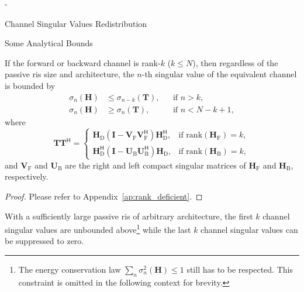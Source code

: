 \begin{section}{-}
\begin{subsection}{Channel Singular Values Redistribution}
\begin{subsubsection}{Some Analytical Bounds}
			\begin{proposition}\label{pp:rank_deficient}
				If the forward or backward channel is rank-$k$ ($k \le N$), then regardless of the passive \gls{ris} size and architecture, the $n$-th singular value of the equivalent channel is bounded by
				\begin{subequations}
					\begin{align}
						\sigma_n(\mathbf{H}) & \le \sigma_{n-k}(\mathbf{T}), &  & \text{if } n > k, \label{iq:sv_bound_enlarge}          \\
						\sigma_n(\mathbf{H}) & \ge \sigma_n(\mathbf{T}),     &  & \text{if } n < N - k + 1, \label{iq:sv_bound_suppress}
					\end{align}
					\label{iq:sv_bound_rank_deficient}
				\end{subequations}
				where
				\begin{equation}
					\mathbf{T} \mathbf{T}^\mathsf{H} =
					\begin{cases}
						\mathbf{H}_\mathrm{D} (\mathbf{I} - \mathbf{V}_\mathrm{F} \mathbf{V}_\mathrm{F}^\mathsf{H}) \mathbf{H}_\mathrm{D}^\mathsf{H}, & \text{if } \mathrm{rank}(\mathbf{H}_\mathrm{F}) = k, \\
						\mathbf{H}_\mathrm{D}^\mathsf{H} (\mathbf{I} - \mathbf{U}_\mathrm{B} \mathbf{U}_\mathrm{B}^\mathsf{H}) \mathbf{H}_\mathrm{D}, & \text{if } \mathrm{rank}(\mathbf{H}_\mathrm{B}) = k,
					\end{cases}
					\label{eq:auxiliary_matrix}
				\end{equation}
				and $\mathbf{V}_\mathrm{F}$ and $\mathbf{U}_\mathrm{B}$ are the right and left compact singular matrices of $\mathbf{H}_\mathrm{F}$ and $\mathbf{H}_\mathrm{B}$, respectively.
			\end{proposition}
			\begin{proof}
				Please refer to Appendix~\ref{ap:rank_deficient}.
			\end{proof}

			\begin{corollary}
				With a sufficiently large passive \gls{ris} of arbitrary architecture, the first $k$ channel singular values are unbounded above\footnote{The energy conservation law $\sum_n \sigma_n^2(\mathbf{H}) \le 1$ still has to be respected. This constraint is omitted in the following context for brevity.} while the last $k$ channel singular values can be suppressed to zero.
			\end{corollary}


\end{subsubsection}
\end{subsection}
\end{section}
